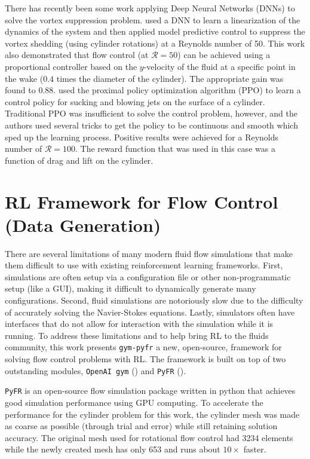 \documentclass{article}
\begin{document}
There has recently been some work applying Deep Neural Networks (DNNs) to solve the vortex suppression problem. \cite{morton2018deep} used a DNN to learn a linearization of the dynamics of the system and then applied model predictive control to suppress the vortex shedding (using cylinder rotations) at a Reynolds number of 50. This work also demonstrated that flow control (at $\mathcal{R} = 50$) can be achieved using a proportional controller based on the $y$-velocity of the fluid at a specific point in the wake ($0.4$ times the diameter of the cylinder). The appropriate gain was found to $0.88$.  \cite{rabault2018deep, rabault2019artificial} used the proximal policy optimization algorithm (PPO) \cite{schulman2017proximal} to learn a control policy for sucking and blowing jets on the surface of a cylinder. Traditional PPO was insufficient to solve the control problem, however, and the authors used several tricks to get the policy to be continuous and smooth which sped up the learning process. Positive results were achieved for a Reynolds number of $\mathcal{R} = 100$. The reward function that was used in this case was a function of drag and lift on the cylinder.

\section{RL Framework for Flow Control (Data Generation)}
\label{sec:data}

There are several limitations of many modern fluid flow simulations that make them difficult to use with existing reinforcement learning frameworks. First, simulations are often setup via a configuration file or other non-programmatic setup (like a GUI), making it difficult to dynamically generate many configurations. Second, fluid simulations are notoriously slow due to the difficulty of accurately solving the Navier-Stokes equations. Lastly, simulators often have interfaces that do not allow for interaction with the simulation while it is running.  To address these limitations and to help bring RL to the fluids community, this work presents \verb|gym-pyfr| a new, open-source, framework for solving flow control problems with RL. The framework is built on top of two outstanding modules, \verb|OpenAI gym| (\cite{brockman2016openai}) and \verb|PyFR| (\cite{witherden2014pyfr}). 

\verb|PyFR| is an open-source flow simulation package written in python that achieves good simulation performance using GPU computing. To accelerate the performance for the cylinder problem for this work, the cylinder mesh was made as coarse as possible (through trial and error) while still retaining solution accuracy. The original mesh used for rotational flow control had 3234 elements while the newly created mesh has only 653 and runs about $10\times$ faster.
\end{document}
